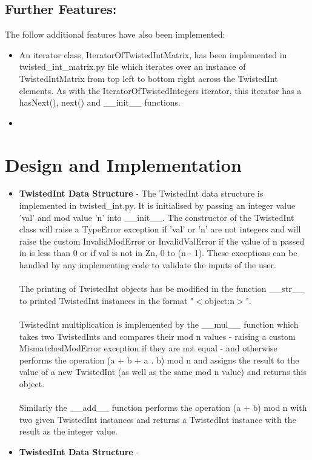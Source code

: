\documentclass[11]{article}
\begin{document}
	\subsection{Further Features:}
		The follow additional features have also been implemented:
		\begin{itemize}
			\item An iterator class, IteratorOfTwistedIntMatrix, has been implemented in twisted\_int\_matrix.py file which iterates over an instance of TwistedIntMatrix from top left to bottom right across the TwistedInt elements. As with the IteratorOfTwistedIntegers iterator, this iterator has a hasNext(), next() and \_\_init\_\_ functions.
			\item 
		\end{itemize}

	\section{Design and Implementation}
		\begin{itemize}
			\item \textbf{TwistedInt Data Structure} - The TwistedInt data structure is implemented in twisted\_int.py. It is initialised by passing an integer value 'val' and mod value 'n' into \_\_init\_\_. The constructor of the TwistedInt class will raise a TypeError exception if 'val' or 'n' are not integers and will raise the custom InvalidModError or InvalidValError if the value of n passed in is less than 0 or if val is not in Zn, 0 to (n - 1). These exceptions can be handled by any implementing code to validate the inputs of the user. \\\\ The printing of TwistedInt objects has be modified in the function \_\_str\_\_ to printed TwistedInt instances in the format "$<$object:n$>$". \\\\ TwistedInt multiplication is implemented by the \_\_mul\_\_ function which takes two TwistedInts and compares their mod n values - raising a custom MismatchedModError exception if they are not equal - and otherwise performs the operation (a + b + a . b) mod n and assigns the result to the value of a new TwistedInt (as well as the same mod n value) and returns this object. \\\\ Similarly the \_\_add\_\_ function performs the operation (a + b) mod n with two given TwistedInt instances and returns a TwistedInt instance with the result as the integer value. 
			
			\item \textbf{TwistedInt Data Structure} -
		\end{itemize}
		
\end{document}
